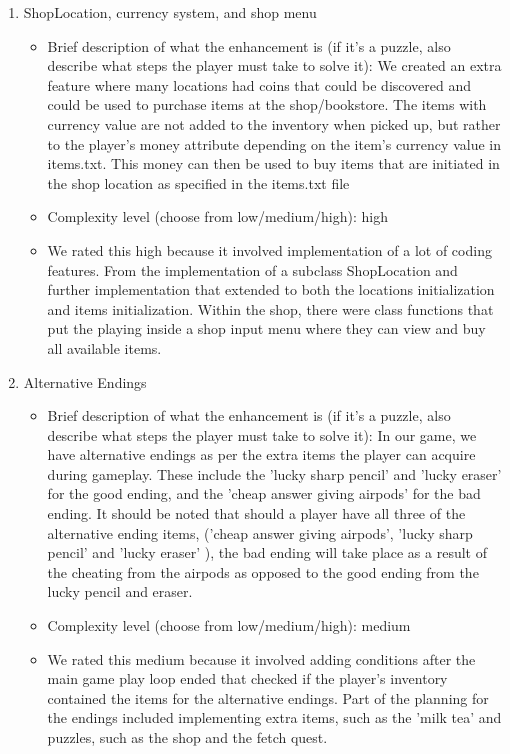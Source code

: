 \documentclass[11pt]{article}
\begin{document}
\begin{enumerate}
\item ShopLocation, currency system, and shop menu
	\begin{itemize}
	\item Brief description of what the enhancement is (if it's a puzzle, also describe what steps the player must take to solve it): We created an extra feature where many locations had coins that could be discovered and could be used to purchase items at the shop/bookstore. The items with currency value are not added to the inventory when picked up, but rather to the player's money attribute depending on the item's currency value in items.txt. This money can then be used to buy items that are initiated in the shop location as specified in the items.txt file
	\item Complexity level (choose from low/medium/high): high
	\item  We rated this high because it involved implementation of a lot of coding features. From the implementation of a subclass ShopLocation and further implementation that extended to both the locations initialization and items initialization. Within the shop, there were class functions that put the playing inside a shop input menu where they can view and buy all available items.
	\end{itemize}
 
\item Alternative Endings
	\begin{itemize}
	\item Brief description of what the enhancement is (if it's a puzzle, also describe what steps the player must take to solve it): In our game, we have alternative endings as per the extra items the player can acquire during gameplay. These include the 'lucky sharp pencil' and 'lucky eraser' for the good ending, and the 'cheap answer giving airpods' for the bad ending. It should be noted that should a player have all three of the alternative ending items, ('cheap answer giving airpods', 'lucky sharp pencil' and 'lucky eraser' ), the bad ending will take place as a result of the cheating from the airpods as opposed to the good ending from the lucky pencil and eraser.
	\item Complexity level (choose from low/medium/high): medium
	\item  We rated this medium because it involved adding conditions after the main game play loop ended that checked if the player's inventory contained the items for the alternative endings. Part of the planning for the endings included implementing extra items, such as the 'milk tea' and puzzles, such as the shop and the fetch quest.
	\end{itemize}
 

\end{enumerate}
\end{document}
